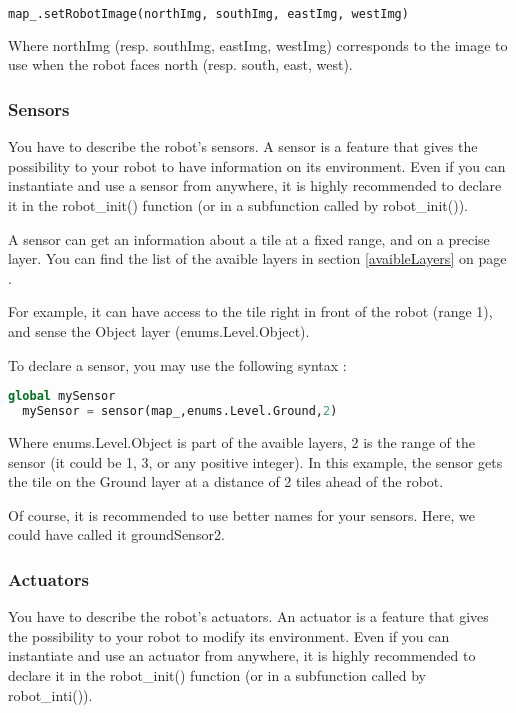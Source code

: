 \documentclass[a4paper,11pt]{article}
\begin{document}
\begin{lstlisting}[language=Python]
map_.setRobotImage(northImg, southImg, eastImg, westImg)
\end{lstlisting}

Where northImg (resp. southImg, eastImg, westImg) corresponds to the
image to use when the robot faces north (resp. south, east, west).

\subsubsection{Sensors}

You have to describe the robot's sensors. A sensor is a feature that
gives the possibility to your robot to have information on its
environment. Even if you can instantiate and use a sensor from
anywhere, it is highly recommended to declare it in the robot\_init()
function (or in a subfunction called by robot\_init()).

A sensor can get an information about a tile at a fixed range, and on
a precise layer. You can find the list of the avaible layers in
section \ref{avaibleLayers} on page \pageref{avaibleLayers}.

For example, it can have access to the tile right in front of the
robot (range 1), and sense the Object layer (enums.Level.Object).

To declare a sensor, you may use the following syntax :

\begin{lstlisting}[language=Python]
  global mySensor
  mySensor = sensor(map_,enums.Level.Ground,2)
\end{lstlisting}

Where enums.Level.Object is part of the avaible layers, 2 is the range
of the sensor (it could be 1, 3, or any positive integer). In this
example, the sensor gets the tile on the Ground layer at a distance of
2 tiles ahead of the robot.

Of course, it is recommended to use better names for your
sensors. Here, we could have called it groundSensor2.

\subsubsection{Actuators}

You have to describe the robot's actuators. An actuator is a feature
that gives the possibility to your robot to modify its
environment. Even if you can instantiate and use an actuator from
anywhere, it is highly recommended to declare it in the robot\_init()
function (or in a subfunction called by robot\_inti()).
\end{document}
